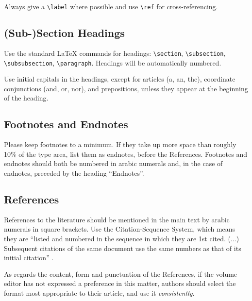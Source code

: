 \documentclass{IOS-Book-Article}
\begin{document}
Always give a \verb|\label| where possible and use \verb|\ref| for cross-referencing.


\subsection{(Sub-)Section Headings}
Use the standard \LaTeX{} commands for headings: {\small \verb|\section|, \verb|\subsection|, \verb|\subsubsection|, \verb|\paragraph|}.
Headings will be automatically numbered.

Use initial capitals in the headings, except for articles (a, an, the), coordinate
conjunctions (and, or, nor), and prepositions, unless they appear at the beginning
of the heading.

\subsection{Footnotes and Endnotes}
Please keep footnotes to a minimum. If they take up more space than roughly 10\% of
the type area, list them as endnotes, before the References. Footnotes and endnotes
should both be numbered in arabic numerals and, in the case of endnotes, preceded by
the heading ``Endnotes''.

\subsection{References}

References to the literature should be mentioned in the main text by arabic numerals in
square brackets. Use the Citation-Sequence System, which means they are ``listed and
numbered in the sequence in which they are 1st cited. ($\ldots$) Subsequent citations of the
same document use the same numbers as that of its initial citation'' \cite{r1}.

As regards the content, form and punctuation of the References, if the volume
editor has not expressed a preference in this matter, authors should select the format
most appropriate to their article, and use it \textit{consistently}.
\end{document}
